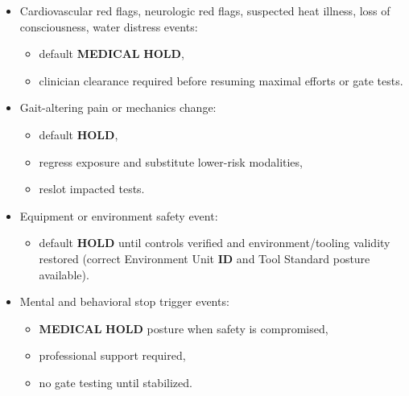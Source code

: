 \documentclass[10pt]{article}
\begin{document}
\begin{itemize}
\item Cardiovascular red flags, neurologic red flags, suspected heat illness, loss of consciousness, water distress events:
  \begin{itemize}
  \item default \textbf{MEDICAL} \textbf{HOLD},
  \item clinician clearance required before resuming maximal efforts or gate tests.
  \end{itemize}
\item Gait-altering pain or mechanics change:
  \begin{itemize}
  \item default \textbf{HOLD},
  \item regress exposure and substitute lower-risk modalities,
  \item reslot impacted tests.
  \end{itemize}
\item Equipment or environment safety event:
  \begin{itemize}
  \item default \textbf{HOLD} until controls verified and environment/tooling validity restored (correct Environment Unit \textbf{ID} and Tool Standard posture available).
  \end{itemize}
\item Mental and behavioral stop trigger events:
  \begin{itemize}
  \item \textbf{MEDICAL} \textbf{HOLD} posture when safety is compromised,
  \item professional support required,
  \item no gate testing until stabilized.
  \end{itemize}
\end{itemize}
\end{document}
